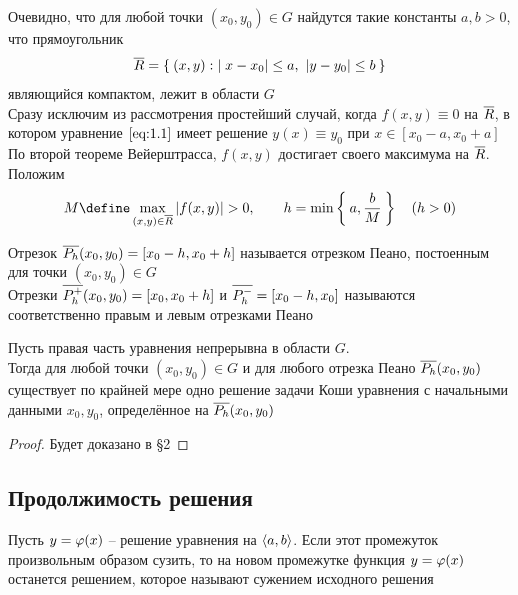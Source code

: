 \begin{algorithm}[Пеано]
	Очевидно, что для любой точки $ (x_0, y_0) \in G $ найдутся такие константы $ a, b > 0 $, что прямоугольник
    $$ \overline{R} = \Set{(x, y) : |x - x_0| \le a, ~ |y - y_0| \le b} $$
    являющийся компактом, лежит в области $ G $ \\
    Сразу исключим из рассмотрения простейший случай, когда $ f(x, y) \equiv 0 $ на $ \overline{R} $, в котором уравнение $ \eref{1.1} $ имеет решение $ y(x) \equiv y_0 $ при $ x \in [x_0 - a, x_0 + a] $ \\
    По второй теореме Вейерштрасса, $ f(x, y) $ достигает своего максимума на $ \overline{R} $. Положим
    $$ M \define \max\limits_{(x, y) \in \ol{R}}|f(x, y)| > 0, \qquad h = \min\set{a, \frac{b}M} \quad (h > 0) $$
\end{algorithm}

\begin{definition}
    Отрезок $ \overline{P_h}(x_0, y_0) = [x_0 - h, x_0 + h] $ называется отрезком Пеано, постоенным для точки $ (x_0, y_0) \in G $ \\
    Отрезки $ \overline{P_h^+}(x_0, y_0) = [x_0, x_0 + h] $ и $ \overline{P_h^-} = [x_0 - h, x_0] $ называются соответственно правым и левым отрезками Пеано
\end{definition}

\begin{theorem}\label{th:Peano}
    Пусть правая часть уравнения  непрерывна в области $ G $. \\
    Тогда для любой точки $ (x_0, y_0) \in G $ и для любого отрезка Пеано $ \overline{P_h}(x_0, y_0) $ существует по крайней мере одно решение задачи Коши уравнения  с начальными данными $ x_0, y_0 $, определённое на $ \overline{P_h}(x_0, y_0) $
\end{theorem}

\begin{proof}
	Будет доказано в \S2
\end{proof}

\subsection{Продолжимость решения}

\begin{definition}
    Пусть $ y = \varphi(x) $ -- решение уравнения  на $ \Braket{a, b} $. Если этот промежуток произвольным образом сузить, то на новом промежутке функция $ y = \varphi(x) $ останется решением, которое называют сужением исходного решения
\end{definition}

